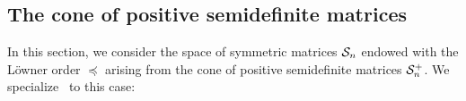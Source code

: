 \documentclass[main]{subfiles}
\begin{document}
%

%
%



\subsection{The cone of positive semidefinite matrices}

In this section, we consider the space of symmetric matrices $\mathcal{S}_n$ endowed with the L\"owner order $\preceq$ arising from the cone of positive semidefinite matrices $\mathcal{S}_n^+$.
We specialize~ to this case:
\end{document}
